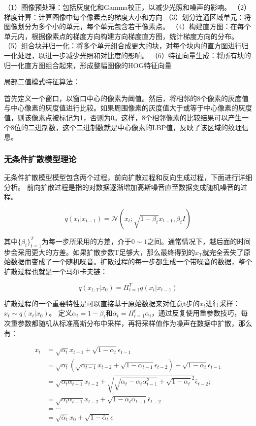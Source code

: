 （1）图像预处理：包括灰度化和Gamma校正，以减少光照和噪声的影响。
（2）‌梯度计算：‌计算图像中每个像素点的梯度大小和方向
（3）划分连通区域单元：‌将图像划分为多个小的单元，每个单元包含若干像素点。
（4）构建直方图：‌在每个单元内，根据像素点的梯度方向构建方向梯度直方图，统计梯度方向的分布。
（5）组合块并归一化：将多个单元组合成更大的块，对每个块内的直方图进行归一化处理，以进一步减少光照和对比度的影响。
（6）特征向量生成：将所有块的归一化直方图组合起来，形成整幅图像的HOG特征向量


\par
局部二值模式特征算法：
\par
首先定义一个窗口‌，以窗口中心的像素为阈值。然后，将相邻的8个像素的灰度值与中心像素的灰度值进行比较。如果周围像素的灰度值大于或等于中心像素的灰度值，则该像素点被标记为1，否则为0。这样，8个相邻像素的比较结果可以产生一个8位的二进制数，这个二进制数就是中心像素的LBP值，反映了该区域的纹理信息。

\subsubsection{无条件扩散模型理论}\label{sec:DDPM}
无条件扩散模型模型包含两个过程，前向扩散过程和反向生成过程，下面进行详细分析。
前向扩散过程是指的对数据逐渐增加高斯噪音直至数据变成随机噪音的过程。

\begin{equation}\label{eqn-11}
      q(x_t|x_{t-1})=\mathcal{N}(x_t;\sqrt{1-\beta_t}x_{t-1},\beta_tI)
\end{equation}

其中$\{\beta_t\}^{T}_{t=1}$为每一步所采用的方差，介于$0 \sim 1$之间。通常情况下，越后面的时间步会采用更大的方差。如果扩散步数T足够大，那么最终得到的$x_T$就完全丢失了原始数据而变成了一个随机噪音。扩散过程的每一步都生成一个带噪音的数据，整个扩散过程也就是一个马尔卡夫链：

\begin{equation}\label{eqn-12}
      q(x_{1:T}|x_0) = \Pi^T_{t=1}{q(x_t|x_{t-1})}
\end{equation}

扩散过程的一个重要特性是可以直接基于原始数据来对任意t步的$x_t$进行采样：$x_t \sim q(x_t|x_0)$。
定义$\alpha_t = 1 - \beta_t$和$\overline{\alpha}_t=\Pi^t_{i=1}{\alpha_i}$，通过反复使用重参数技巧，每次重参数都随机从标准高斯分布中采样，再将采样值作为噪声在数据中扩散，那么有：

\begin{align}
x_t &= \sqrt{\alpha_t}x_{t-1} + \sqrt{1-\alpha_t}\epsilon_{t-1} \nonumber\\
    &= \sqrt{\alpha_t}(\sqrt{\alpha_{t-1}}x_{t-2} + \sqrt{1-\alpha_{t-1}}\epsilon_{t-2}) + \sqrt{1-\alpha_t}\epsilon_{t-1} \nonumber\\
    &= \sqrt{\alpha_t\alpha_{t-1}}x_{t-2} + \sqrt{\sqrt{\alpha_t-\alpha_t\alpha_{t-1}^2}+ \sqrt{1-\alpha_t}^2}\overline{\epsilon}_{t-2}; \nonumber\\
    &= \sqrt{\alpha_t\alpha_{t-1}}x_{t-2} + \sqrt{1-\alpha_t\alpha_{t-1}}\overline{\epsilon}_{t-2} \nonumber\\
    &= \cdots \nonumber\\
    &= \sqrt{\overline{\alpha}_t}x_{0} + \sqrt{1-\overline{\alpha}_t}\epsilon \label{eqn-13}
\end{align}


